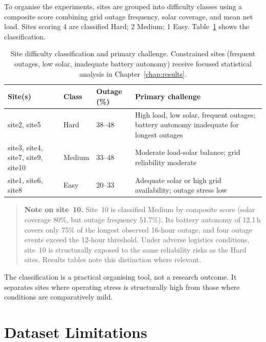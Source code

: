 To organise the experiments, sites are grouped into difficulty classes using a
composite score combining grid outage frequency, solar coverage, and mean net
load.  Sites scoring 4 are classified Hard; 2 Medium; 1 Easy.
Table~\ref{tab:difficulty} shows the classification.

\begin{table}[htb]
\centering
\small
\caption{Site difficulty classification and primary challenge.  Constrained
sites (frequent outages, low solar, inadequate battery autonomy) receive
focused statistical analysis in Chapter~\ref{chap:results}.}
\label{tab:difficulty}
\begin{tabular}{p{3.8cm}p{1.5cm}p{1.5cm}p{5.0cm}}
\toprule
\textbf{Site(s)} & \textbf{Class} & \textbf{Outage (\%)} & \textbf{Primary challenge} \\
\midrule
site2, site5                       & Hard   & 38--48 & High load, low solar, frequent outages;
                                                        battery autonomy inadequate for longest outages \\
site3, site4, site7, site9, site10 & Medium & 33--48 & Moderate load-solar balance; grid
                                                        reliability moderate \\
site1, site6, site8                & Easy   & 20--33 & Adequate solar or high grid availability;
                                                        outage stress low \\
\bottomrule
\end{tabular}
\end{table}

\begin{quote}
\textbf{Note on site~10.}
Site~10 is classified Medium by composite score (solar coverage 80\%, but
outage frequency 51.7\%).  Its battery autonomy of 12.1\,h covers only
75\% of the longest observed 16-hour outage, and four outage events exceed
the 12-hour threshold.  Under adverse logistics conditions, site~10 is
structurally exposed to the same reliability risks as the Hard sites.
Results tables note this distinction where relevant.
\end{quote}

The classification is a practical organising tool, not a research outcome.
It separates sites where operating stress is structurally high
from those where conditions are comparatively mild.


\section{Dataset Limitations}
\label{sec:dataset_limitations}

